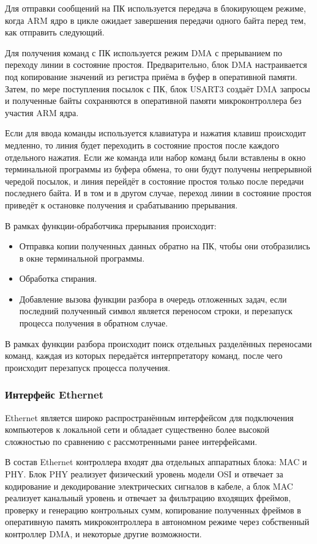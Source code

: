 \documentclass[rusmathsym, eqnumwithinsec, amspack, hyperref]{bomgost}
\begin{document}
Для отправки сообщений на ПК используется передача в блокирующем режиме, когда ARM ядро в цикле ожидает завершения передачи одного байта перед тем, как отправить следующий.

Для получения команд с ПК используется режим DMA с прерыванием по переходу линии в состояние простоя. Предварительно, блок DMA настраивается под копирование значений из регистра приёма в буфер в оперативной памяти. Затем, по мере поступления посылок с ПК, блок USART3 создаёт DMA запросы и полученные байты сохраняются в оперативной памяти микроконтроллера без участия ARM ядра.

Если для ввода команды используется клавиатура и нажатия клавиш происходит медленно, то линия будет переходить в состояние простоя после каждого отдельного нажатия. Если же команда или набор команд были вставлены в окно терминальной программы из буфера обмена, то они будут получены непрерывной чередой посылок, и линия перейдёт в состояние простоя только после передачи последнего байта. И в том и в другом случае, переход линии в состояние простоя приведёт к остановке получения и срабатыванию прерывания.

В рамках функции-обработчика прерывания происходит:

\begin{itemize}
	\item Отправка копии полученных данных обратно на ПК, чтобы они отобразились в окне терминальной программы.
	\item Обработка стирания.
	\item Добавление вызова функции разбора в очередь отложенных задач, если последний полученный символ является переносом строки, и перезапуск процесса получения в обратном случае.
\end{itemize}

В рамках функции разбора происходит поиск отдельных разделённых переносами команд, каждая из которых передаётся интерпретатору команд, после чего происходит перезапуск процесса получения.

\subsubsection{Интерфейс Ethernet}

Ethernet является широко распространённым интерфейсом для подключения компьютеров к локальной сети и обладает существенно более высокой сложностью по сравнению с рассмотренными ранее интерфейсами.

В состав Ethernet контроллера входят два отдельных аппаратных блока: MAC и PHY. Блок PHY реализует физический уровень модели OSI и отвечает за кодирование и декодирование электрических сигналов в кабеле, а блок MAC реализует канальный уровень и отвечает за фильтрацию входящих фреймов, проверку и генерацию контрольных сумм, копирование полученных фреймов в оперативную память микроконтроллера в автономном режиме через собственный контроллер DMA, и некоторые другие возможности.
\end{document}
